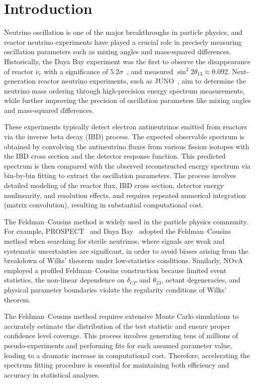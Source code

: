 \documentclass[xetex,twocolumn,epjc3]{svjour3}
\begin{document}
\section{Introduction}
\label{sec:intro}
\justifying
Neutrino oscillation is one of the major breakthroughs in particle physics, and reactor neutrino experiments have played a crucial role in precisely measuring oscillation parameters such as mixing angles and mass-squared differences. Historically, the Daya Bay experiment was the first to observe the disappearance of reactor $\overline{\nu}_e$ with a significance of 5.2$\sigma$~\cite{PhysRevLett.108.171803}, and measured $\sin^2 2\theta_{13} \approx 0.092$. Next-generation reactor neutrino experiments, such as JUNO~\cite{Abusleme2025}, aim to determine the neutrino mass ordering through high-precision energy spectrum measurements, while further improving the precision of oscillation parameters like mixing angles and mass-squared differences.

These experiments typically detect electron antineutrinos emitted from reactors via the inverse beta decay (IBD) process. The expected observable spectrum is obtained by convolving the antineutrino fluxes from various fission isotopes with the IBD cross section and the detector response function. This predicted spectrum is then compared with the observed reconstructed energy spectrum via bin-by-bin fitting to extract the oscillation parameters. The process involves detailed modeling of the reactor flux, IBD cross section, detector energy nonlinearity, and resolution effects, and requires repeated numerical integration (matrix convolution), resulting in substantial computational cost.

The Feldman–Cousins method is widely used in the particle physics community. For example, PROSPECT~\cite{PhysRevD.103.032001} and Daya Bay~\cite{PhysRevLett.133.051801} adopted the Feldman–Cousins method when searching for sterile neutrinos, where signals are weak and systematic uncertainties are significant, in order to avoid biases arising from the breakdown of Wilks’ theorem under low-statistics conditions. Similarly, NOvA~\cite{refId0} employed a profiled Feldman–Cousins construction because limited event statistics, the non-linear dependence on $\delta_{CP}$ and $\theta_{23}$, octant degeneracies, and physical parameter boundaries violate the regularity conditions of Wilks’ theorem. 

The Feldman–Cousins method requires extensive Monte Carlo simulations to accurately estimate the distribution of the test statistic and ensure proper confidence level coverage. This process involves generating tens of millions of pseudo-experiments and performing fits for each assumed parameter value, leading to a dramatic increase in computational cost. Therefore, accelerating the spectrum fitting procedure is essential for maintaining both efficiency and accuracy in statistical analyses.
\end{document}
